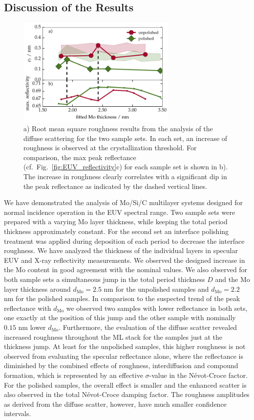\subsection{Discussion of the Results}
\begin{figure}[htbp]
\centering
\includegraphics[width=0.7\textwidth]{img/MoSiC_PSD_results}
\caption{a) Root mean square roughness results from the analysis of the diffuse scattering for the two sample sets. In each set, an increase of roughness is observed at the crystallization threshold. For comparison, the max peak reflectance (cf.~Fig.~\ref{fig:EUV_reflectivity}c) for each sample set is shown in b). The increase in roughness clearly correlates with a significant dip in the peak reflectance as indicated by the dashed vertical lines.}
\label{fig:PSD_results}
\end{figure}
We have demonstrated the analysis of Mo/Si/C multilayer systems designed for normal incidence operation in the EUV spectral range. Two sample sets were prepared with a varying Mo layer thickness, while keeping the total period thickness approximately constant. For the second set an interface polishing treatment was applied during deposition of each period to decrease the interface roughness. We have analyzed the thickness of the individual layers in specular EUV and X-ray reflectivity measurements. We observed the designed increase in the Mo content in good agreement with the nominal values. We also observed for both sample sets a simultaneous jump in the total period thickness $D$ and the Mo layer thickness around $d_\text{Mo} = 2.5$ nm for the unpolished samples and $d_\text{Mo} = 2.2$ nm for the polished samples. In comparison to the suspected trend of the peak reflectance with $d_\text{Mo}$ we observed two samples with lower reflectance in both sets, one exactly at the position of this jump and the other sample with nominally $0.15$ nm lower $d_\text{Mo}$. Furthermore, the evaluation of the diffuse scatter revealed increased roughness throughout the ML stack for the samples just at the thickness jump. At least for the unpolished samples, this higher roughness is not observed from evaluating the specular reflectance alone, where the reflectance is diminished by the combined effects of roughness, interdiffusion and compound formation, which is represented by an effective $\sigma$-value in the N\'{e}vot-Croce factor. For the polished samples, the overall effect is smaller and the enhanced scatter is also observed in the total N\'{e}vot-Croce damping factor. The roughness amplitudes as derived from the diffuse scatter, however, have much smaller confidence intervals.

